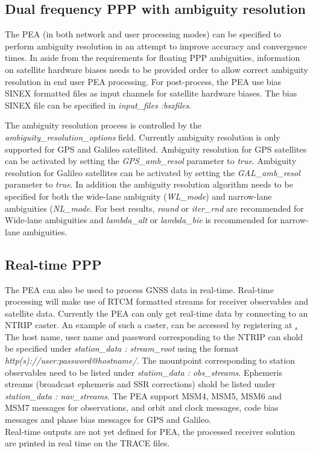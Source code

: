 \subsection{Dual frequency PPP with ambiguity resolution}
The PEA (in both network and user processing modes) can be specified to perform ambiguity resolution in an attempt to improve accuracy and convergence times.
In aside from the requirements for floating PPP ambiguities, information on satellite hardware biases needs to be provided order to allow correct ambiguity resolution in end user PEA processing.
For post-process, the PEA use bias SINEX formatted files as input channels for satellite hardware biases.
The bias SINEX file can be specified in \textit{input\_files :bsxfiles}.

The ambiguity resolution process is controlled by the \textit{ambiguity\_resolution\_options} field.
Currently ambiguity resolution is only supported for GPS and Galileo satellited. 
Ambiguity resolution for GPS satellites can be activated by setting the \textit{GPS\_amb\_resol} parameter to \textit{true}.
Ambiguity resolution for Galileo satellites can be activated by setting the \textit{GAL\_amb\_resol} parameter to \textit{true}.
In addition the ambiguity resolution algorithm needs to be specified for both the wide-lane ambiguity (\textit{WL\_mode}) and narrow-lane ambiguities (\textit{NL\_mode}.
For best results, \textit{round} or \textit{iter\_rnd} are recommended for Wide-lane ambiguities and  \textit{lambda\_alt} or \textit{lambda\_bie} is recommended for narrow-lane ambiguities.\\

\subsection{Real-time PPP}
The PEA can also be used to process GNSS data in real-time. 
Real-time processing will make use of RTCM formatted streams for receiver observables and satellite data.
Currently the PEA can only get real-time data by connecting to an NTRIP caster.
An example of such a caster, can be accessed by registering at \href{https://www.auscors.ga.gov.au/}.
The host name, user name and password corresponding to the NTRIP can shold be specified under \textit{station\_data : stream\_root} using the format \textit{http(s)://user:password@hostname/}.
The mountpoint corresponding to station observables need to be listed under \textit{station\_data : obs\_streams}.
Ephemeris streams (broadcast ephemeris and SSR corrections) shold be listed under \textit{station\_data : nav\_streams}.
The PEA support MSM4, MSM5, MSM6 and MSM7 messages for observations, and orbit and clock messages, code bias messages and phase bias messages for GPS and Galileo.\\

Real-time outputs are not yet defined for PEA, the processed receiver solution are printed in real time on the TRACE files.\\